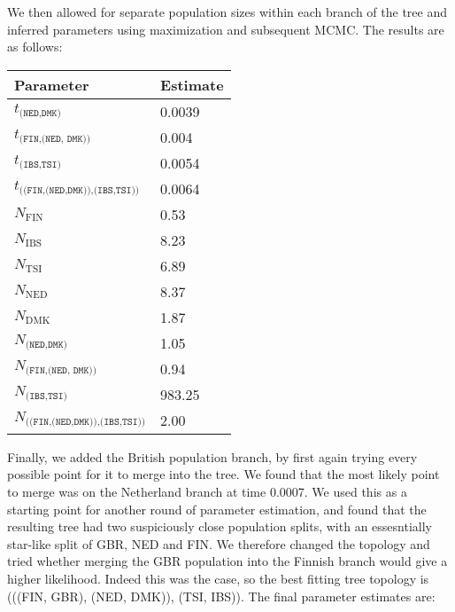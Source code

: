 \documentclass[a4paper]{article}
\begin{document}
We then allowed for separate population sizes within each branch of the tree and inferred parameters using maximization and subsequent MCMC. The results are as follows:

\begin{tabular}{ll}
    \textbf{Parameter} & \textbf{Estimate}\\ \hline
    $t_\texttt{(NED,DMK)}$ & 0.0039\\
    $t_\texttt{(FIN,(NED, DMK))}$ & 0.004\\
    $t_\texttt{(IBS,TSI)}$ & 0.0054\\
    $t_\texttt{((FIN,(NED,DMK)),(IBS,TSI))}$ & 0.0064\\
    $N_\mathrm{FIN}$ & 0.53\\
    $N_\mathrm{IBS}$ & 8.23\\
    $N_\mathrm{TSI}$ & 6.89\\
    $N_\mathrm{NED}$ & 8.37\\
    $N_\mathrm{DMK}$ & 1.87\\
    $N_\texttt{(NED,DMK)}$ & 1.05\\
    $N_\texttt{(FIN,(NED, DMK))}$ & 0.94\\
    $N_\texttt{(IBS,TSI)}$ & 983.25\\
    $N_\texttt{((FIN,(NED,DMK)),(IBS,TSI))}$ & 2.00\\
\end{tabular}

Finally, we added the British population branch, by first again trying every possible point for it to merge into the tree. We found that the most likely point to merge was on the Netherland branch at time 0.0007. We used this as a starting point for another round of parameter estimation, and found that the resulting tree had two suspiciously close population splits, with an essesntially star-like split of GBR, NED and FIN. We therefore changed the topology and tried whether merging the GBR population into the Finnish branch would give a higher likelihood. Indeed this was the case, so the best fitting tree topology is (((FIN, GBR), (NED, DMK)), (TSI, IBS)). The final parameter estimates are:
\end{document}
